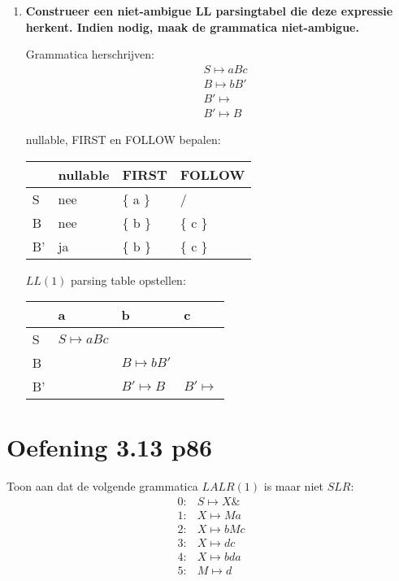 \begin{enumerate}
	\item \textbf{Construeer een niet-ambigue LL parsingtabel die deze expressie herkent. Indien nodig, maak de grammatica niet-ambigue.}
		
		Grammatica herschrijven:
	\begin{equation*}
	\begin{split}
	& S \mapsto aBc \\
	& B \mapsto bB' \\
	& B' \mapsto  \\
	& B' \mapsto B 
	\end{split}
	\end{equation*}
	
	nullable, FIRST en FOLLOW bepalen:
	\begin{table}[ht]
		\centering
		\begin{tabular}{| l | l | l | l |}
			\hline
			& nullable & FIRST & FOLLOW \\
			\hline
			S & nee  & \{ a \}    & /	 			\\
			B & nee  & \{ b \}    & \{ c \}	\\
			B' & ja  & \{ b \}    & \{ c \}			\\
			\hline
		\end{tabular}
	\end{table}

	$LL(1)$ parsing table opstellen:
	
	\begin{table}[h]
		\centering
		\begin{tabular}{| l | l | l | l |}
			\hline
			  & a 					& b & c \\
			  \hline
			S & $S \mapsto aBc$	    &   &   \\
			B &   					& $B \mapsto bB'$  &   \\
			B' &  & $B' \mapsto B$ & $B' \mapsto$ \\
			\hline
		\end{tabular}
	\end{table}
	
\end{enumerate}

\section{Oefening 3.13 p86}
Toon aan dat de volgende grammatica $LALR(1)$ is maar niet $SLR$:
\begin{equation*}
\begin{split}
0 :& S \mapsto X\& \\
1 :& X \mapsto Ma \\
2 :& X \mapsto bMc \\
3 :& X \mapsto dc \\
4 :& X \mapsto bda \\
5 :& M \mapsto d
\end{split}
\end{equation*}


